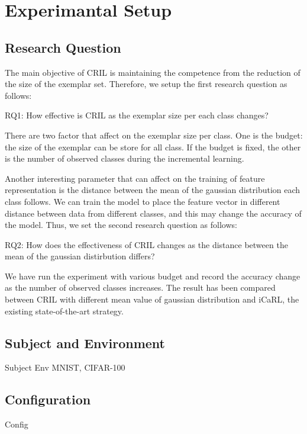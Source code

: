 \section{Experimantal Setup}
\label{sec:setup}

\subsection{Research Question}
\label{sec:rq}

The main objective of CRIL is maintaining the competence from the reduction of the size of the exemplar set. Therefore, we setup the first research question as follows:

\begin{framed}
\textsc{RQ1}: How effective is CRIL as the exemplar size per each class changes?
\label{rq1}
\end{framed}

There are two factor that affect on the exemplar size per class. One is the budget: the size of the exemplar can be store for all class. If the budget is fixed, the other is the number of observed classes during the incremental learning.

Another interesting parameter that can affect on the training of feature representation is the distance between the mean of the gaussian distribution each class follows. We can train the model to place the feature vector in different distance between data from different classes, and this may change the accuracy of the model. Thus, we set the second research question as follows:

\begin{framed}
\textsc{RQ2}: How does the effectiveness of CRIL changes as the distance between the mean of the gaussian distirbution differs?
\label{rq2}
\end{framed}

We have run the experiment with various budget and record the accuracy change as the number of observed classes increases. The result has been compared between CRIL with different mean value of gaussian distribution and iCaRL, the existing state-of-the-art strategy.

\subsection{Subject and Environment}
\label{sec:subject}

Subject
Env
MNIST, CIFAR-100

\subsection{Configuration}
\label{sec:configuration}


Config

